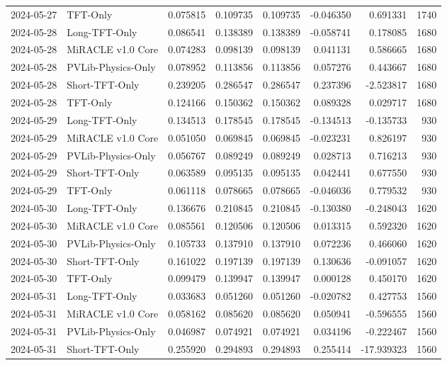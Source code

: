 \begin{tabular}{llrrrrrr}
2024-05-27 & TFT-Only & 0.075815 & 0.109735 & 0.109735 & -0.046350 & 0.691331 & 1740 \\
2024-05-28 & Long-TFT-Only & 0.086541 & 0.138389 & 0.138389 & -0.058741 & 0.178085 & 1680 \\
2024-05-28 & MiRACLE v1.0 Core & 0.074283 & 0.098139 & 0.098139 & 0.041131 & 0.586665 & 1680 \\
2024-05-28 & PVLib-Physics-Only & 0.078952 & 0.113856 & 0.113856 & 0.057276 & 0.443667 & 1680 \\
2024-05-28 & Short-TFT-Only & 0.239205 & 0.286547 & 0.286547 & 0.237396 & -2.523817 & 1680 \\
2024-05-28 & TFT-Only & 0.124166 & 0.150362 & 0.150362 & 0.089328 & 0.029717 & 1680 \\
2024-05-29 & Long-TFT-Only & 0.134513 & 0.178545 & 0.178545 & -0.134513 & -0.135733 & 930 \\
2024-05-29 & MiRACLE v1.0 Core & 0.051050 & 0.069845 & 0.069845 & -0.023231 & 0.826197 & 930 \\
2024-05-29 & PVLib-Physics-Only & 0.056767 & 0.089249 & 0.089249 & 0.028713 & 0.716213 & 930 \\
2024-05-29 & Short-TFT-Only & 0.063589 & 0.095135 & 0.095135 & 0.042441 & 0.677550 & 930 \\
2024-05-29 & TFT-Only & 0.061118 & 0.078665 & 0.078665 & -0.046036 & 0.779532 & 930 \\
2024-05-30 & Long-TFT-Only & 0.136676 & 0.210845 & 0.210845 & -0.130380 & -0.248043 & 1620 \\
2024-05-30 & MiRACLE v1.0 Core & 0.085561 & 0.120506 & 0.120506 & 0.013315 & 0.592320 & 1620 \\
2024-05-30 & PVLib-Physics-Only & 0.105733 & 0.137910 & 0.137910 & 0.072236 & 0.466060 & 1620 \\
2024-05-30 & Short-TFT-Only & 0.161022 & 0.197139 & 0.197139 & 0.130636 & -0.091057 & 1620 \\
2024-05-30 & TFT-Only & 0.099479 & 0.139947 & 0.139947 & 0.000128 & 0.450170 & 1620 \\
2024-05-31 & Long-TFT-Only & 0.033683 & 0.051260 & 0.051260 & -0.020782 & 0.427753 & 1560 \\
2024-05-31 & MiRACLE v1.0 Core & 0.058162 & 0.085620 & 0.085620 & 0.050941 & -0.596555 & 1560 \\
2024-05-31 & PVLib-Physics-Only & 0.046987 & 0.074921 & 0.074921 & 0.034196 & -0.222467 & 1560 \\
2024-05-31 & Short-TFT-Only & 0.255920 & 0.294893 & 0.294893 & 0.255414 & -17.939323 & 1560 \\

\end{tabular}
